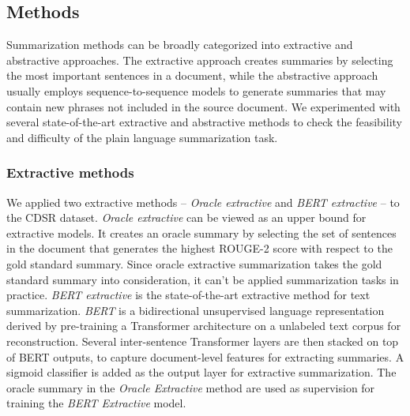 \documentclass[letterpaper, table]{article} %
\begin{document}



\subsection{Methods}
Summarization methods can be broadly categorized into extractive and abstractive approaches. The extractive approach 
creates summaries by selecting the most important sentences in a document,
while the abstractive approach usually employs sequence-to-sequence models to generate summaries that may contain new phrases not included in the source document. We experimented with several state-of-the-art extractive and abstractive methods to check the feasibility and difficulty of the plain language summarization task. 
\subsubsection{Extractive methods}
We applied two extractive methods -- \textit{Oracle extractive} and \textit{BERT extractive} \cite{liu2019text} -- to the CDSR dataset. \textit{Oracle extractive} can be viewed as an upper bound for extractive models. It creates an oracle summary by selecting the set of sentences in the document that generates the highest ROUGE-2 score with respect to the gold standard summary. Since oracle extractive summarization takes the gold standard summary into consideration, it can't be applied summarization tasks in practice. \textit{BERT extractive} is the state-of-the-art extractive method for text summarization. \textit{BERT} \cite{devlin2018bert} is a bidirectional unsupervised language representation derived by pre-training a Transformer architecture on a unlabeled text corpus for reconstruction. Several inter-sentence Transformer layers are then stacked on top of BERT outputs, to capture document-level features for extracting summaries. A sigmoid classifier is added as the output layer for extractive summarization. The oracle summary in the \textit{Oracle Extractive} method are used as supervision for training the \textit{BERT Extractive} model. 
\end{document}
